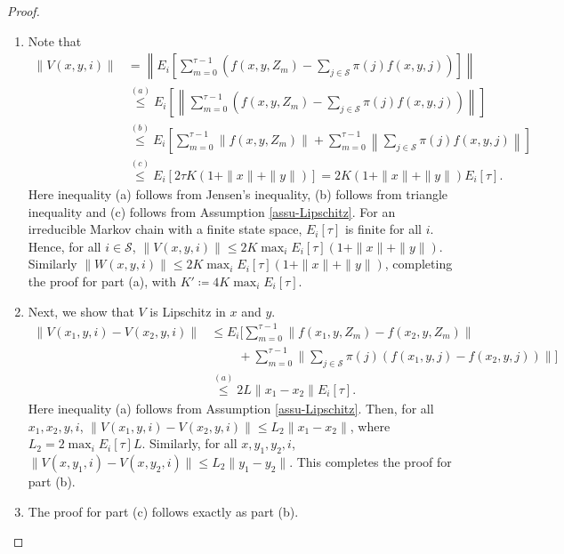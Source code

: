 \documentclass[letterpaper, 10 pt, conference]{ieeeconf}  %
\theoremstyle{definition}
\theoremstyle{plain}
\newcommand{\Scal}{\mathcal{S}}
\begin{document}
\begin{proof}
    \begin{enumerate}[label=(\alph*)]
        \item Note that 
        \begin{align*}
    \|V(x,y,i)\|&= \left\|E_i\left[\sum_{m=0}^{\tau-1}(f(x,y,Z_m)-\sum_{j\in\Scal}\pi(j)f(x,y,j))\right]\right\|\\
    &\stackrel{(a)}{\leq}  E_i\left[\left\|\sum_{m=0}^{\tau-1}(f(x,y,Z_m)-\sum_{j\in\Scal}\pi(j)f(x,y,j))\right\|\right]\\
    &\stackrel{(b)}{\leq}  E_i\left[\sum_{m=0}^{\tau-1}\|f(x,y,Z_m)\|+\sum_{m=0}^{\tau-1}\left\|\sum_{j\in\Scal}\pi(j)f(x,y,j)\right\|\right]\\
    &\stackrel{(c)}{\leq} E_i[2\tau K(1+\|x\|+\|y\|)]= 2K(1+\|x\|+\|y\|)E_i[\tau].
\end{align*}
Here inequality (a) follows from Jensen's inequality, (b) follows from triangle inequality and (c) follows from Assumption \ref{assu-Lipschitz}. For an irreducible Markov chain with a finite state space, $E_i[\tau]$ is finite for all $i$. Hence, for all $i\in\Scal$, $\|V(x,y,i)\|\leq 2K\max_iE_i[\tau](1+\|x\|+\|y\|)$. Similarly $\|W(x,y,i)\|\leq 2K\max_iE_i[\tau](1+\|x\|+\|y\|)$, completing the proof for part (a), with $K'\coloneqq4K\max_iE_i[\tau]$.
\item Next, we show that $V$ is Lipschitz in $x$ and $y$.
\begin{align*}
    \|V(x_1,y,i)-V(x_2,y,i)\|&\leq E_i\Bigg[\sum_{m=0}^{\tau-1}\|f(x_1,y,Z_m)-f(x_2,y,Z_m)\|\\
    &\;\;\;\;\;\;\;\;+\sum_{m=0}^{\tau-1}\Bigg\|\sum_{j\in\Scal}\pi(j)(f(x_1,y,j)-f(x_2,y,j))\Bigg\|\Bigg]\\
    &\stackrel{(a)}{\leq} 2L\|x_1-x_2\|E_i[\tau].
\end{align*}
Here inequality (a) follows from Assumption \ref{assu-Lipschitz}. Then, for all $x_1,x_2,y,i$, $\|V(x_1,y,i)-V(x_2,y,i)\|\leq L_2\|x_1-x_2\|$, where $L_2=2\max_iE_i[\tau]L$. Similarly, for all $x,y_1,y_2,i$, $\|V(x,y_1,i)-V(x,y_2,i)\|\leq L_2\|y_1-y_2\|$. This completes the proof for part (b). 
\item The proof for part (c) follows exactly as part (b).
\end{enumerate}
\end{proof}
\end{document}
